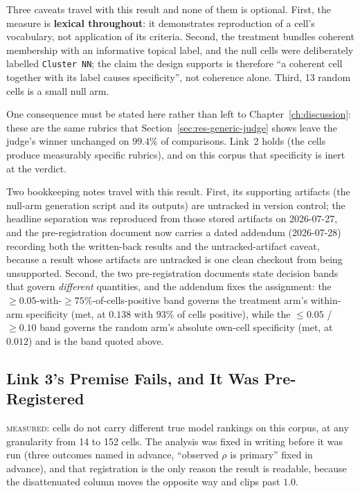 Three caveats travel with this result and none of them is optional.
First, the measure is \textbf{lexical throughout}: it demonstrates
reproduction of a cell's vocabulary, not application of its criteria.
Second, the treatment bundles coherent membership with an informative
topical label, and the null cells were deliberately labelled
\texttt{Cluster NN}; the claim the design supports is therefore
``a coherent cell together with its label causes specificity'', not
coherence alone. Third, 13 random cells is a small null arm.

One consequence must be stated here rather than left to
Chapter~\ref{ch:discussion}: these are the same rubrics that
Section~\ref{sec:res-generic-judge} shows leave the judge's winner
unchanged on $99.4\%$ of comparisons. Link~2 holds (the cells
produce measurably specific rubrics), and on this corpus that
specificity is inert at the verdict.

Two bookkeeping notes travel with this result. First, its supporting
artifacts (the null-arm generation script and its outputs) are
untracked in version control; the headline separation was reproduced
from those stored artifacts on 2026-07-27, and the pre-registration
document now carries a dated addendum (2026-07-28) recording both the
written-back results and the untracked-artifact caveat, because a
result whose artifacts are untracked is one clean checkout from being
unsupported. Second, the two pre-registration documents state decision
bands that govern \emph{different} quantities, and the addendum fixes
the assignment: the $\geq 0.05$-with-$\geq 75\%$-of-cells-positive
band governs the treatment arm's within-arm specificity (met, at
$0.138$ with $93\%$ of cells positive), while the
$\leq 0.05$ / $\geq 0.10$ band governs the random arm's absolute
own-cell specificity (met, at $0.012$) and is the band quoted above.

\subsection{Link 3's Premise Fails, and It Was Pre-Registered}\label{sec:res-granularity}

\textsc{measured}: cells do not carry different true model rankings on
this corpus, at any granularity from 14 to 152 cells. The analysis was
fixed in writing before it was run (three outcomes named in
advance, ``observed $\rho$ is primary'' fixed in advance), and that
registration is the only reason the result is readable, because the
disattenuated column moves the opposite way and clips past $1.0$.

